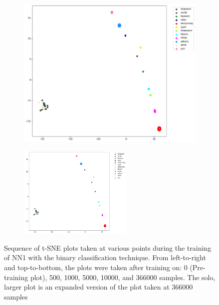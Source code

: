 \begin{enumerate}[left=0pt]
\begin{figure}[htbp]
    \hfill
    \begin{subfigure}{0.325\textwidth}
        \centering
        \includegraphics[trim=30 22 100 0, clip, width=\textwidth]{images/faceReco/nn1-and-binary/tsne-6.png}     
    \end{subfigure}

    \vspace{2mm}
    \begin{subfigure}{\textwidth}
        \centering
        \includegraphics[trim=34 22 100 0, clip, width=0.6\textwidth]{images/faceReco/nn1-and-binary/tsne-6.png}     
    \end{subfigure}

    \caption{
        Sequence of t-SNE plots taken at various points during the training of NN1 with the binary classification technique.
        From left-to-right and top-to-bottom, the plots were taken after training on: 0 (Pre-training plot), 500, 1000, 5000, 10000, and 366000 samples.
        The solo, larger plot is an expanded version of the plot taken at 366000 samples
    }
    \label{Figure:Face-Recognition:Results:nn1-and-binary-tsne-sequence}
\end{figure}


\end{enumerate}
